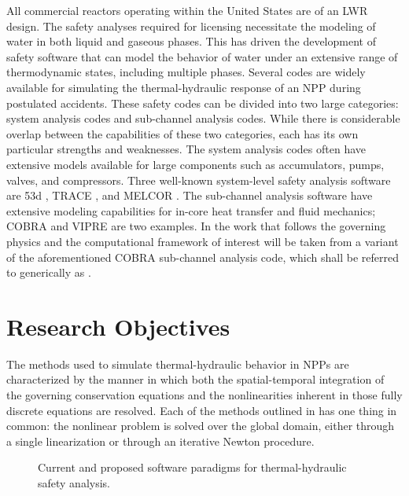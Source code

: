 All commercial reactors operating within the United States are of an LWR design.
The safety analyses required for licensing necessitate the modeling of water in both liquid and gaseous phases.
This has driven the development of safety software that can model the behavior of water under an extensive range of thermodynamic states, including multiple phases.
Several codes are widely available for simulating the thermal-hydraulic response of an NPP during postulated accidents.
These safety codes can be divided into two large categories: system analysis codes and sub-channel analysis codes.
While there is considerable overlap between the capabilities of these two categories, each has its own particular strengths and weaknesses.
The system analysis codes often have extensive models available for large components such as accumulators, pumps, valves, and compressors.
Three well-known system-level safety analysis software are \relap53d{} \cite{RELAP}, TRACE \cite{TRACE}, and MELCOR \cite{Summers1994}.
The sub-channel analysis software have extensive modeling capabilities for in-core heat transfer and fluid mechanics; COBRA \cite{Thurgood1983c} and VIPRE are two examples.
In the work that follows the governing physics and the computational framework of interest will be taken from a variant of the aforementioned COBRA sub-channel analysis code, which shall be referred to generically as \cobra{}.

\section{Research Objectives}
\label{sect:researchObjectives}

The methods used to simulate thermal-hydraulic behavior in NPPs are characterized by the manner in which both the spatial-temporal integration of the governing conservation equations and the nonlinearities inherent in those fully discrete equations are resolved.
Each of the methods outlined in  has one thing in common: the nonlinear problem is solved over the global domain, either through a single linearization or through an iterative Newton procedure.

\begin{figure}[ht!]
\centering

\caption{Current and proposed software paradigms for thermal-hydraulic safety analysis.}
\label{fig:my_diagram}
\end{figure}

